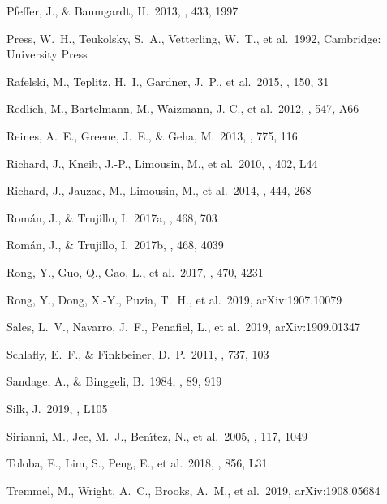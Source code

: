 \documentclass[iop,tighten,twocolumn,apj,floatfix]{emulateapj}
\begin{document}
\begin{thebibliography}{}
 Pfeffer, J., \&
Baumgardt, H.\ 2013, \mnras, 433, 1997

 Press, W.~H., Teukolsky, S.~A., Vetterling, W.~T., et al.\ 1992, Cambridge: University Press

 Rafelski, M., Teplitz,
H.~I., Gardner, J.~P., et al.\ 2015, \aj, 150, 31

 Redlich, M., Bartelmann, M., Waizmann, J.-C., et al.\ 2012, \aap, 547, A66

 Reines, A.~E., Greene, J.~E., \& Geha, M.\ 2013, \apj, 775, 116

 Richard, J., Kneib, J.-P., Limousin, M., et al.\ 2010, \mnras, 402, L44

 Richard, J., Jauzac, M., Limousin, M., et al.\ 2014, \mnras, 444, 268

 Rom{\'a}n, J., \& Trujillo,
    I.\ 2017a, \mnras, 468, 703

 Rom{\'a}n, J., \& Trujillo,
    I.\ 2017b, \mnras, 468, 4039

 Rong, Y., Guo, Q., Gao, L., et al.\ 2017, \mnras, 470, 4231

 Rong, Y., Dong, X.-Y., Puzia, T.~H., et al.\ 2019, arXiv:1907.10079

 Sales, L.~V., Navarro, J.~F., Penafiel, L., et al.\ 2019, arXiv:1909.01347

 Schlafly, E.~F.,
\& Finkbeiner, D.~P.\ 2011, \apj, 737, 103

 Sandage, A., \& Binggeli, B.\ 1984, \aj, 89, 919

 Silk, J.\ 2019, \mnras, L105

 Sirianni, M., Jee, M.~J.,
Ben{\'{\i}}tez, N., et al.\ 2005, \pasp, 117, 1049

 Toloba, E., Lim, S., Peng, E., et al.\ 2018, \apjl, 856, L31

 Tremmel, M., Wright, A.~C., Brooks, A.~M., et al.\ 2019, arXiv:1908.05684


\end{thebibliography}
\end{document}
